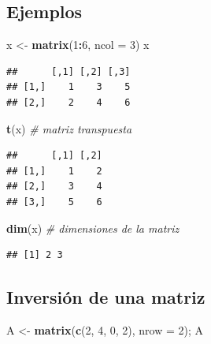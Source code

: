 \documentclass[]{book}
\newenvironment{Shaded}{\begin{snugshade}}{\end{snugshade}}
\newcommand{\KeywordTok}[1]{\textcolor[rgb]{0.13,0.29,0.53}{\textbf{#1}}}
\newcommand{\DataTypeTok}[1]{\textcolor[rgb]{0.13,0.29,0.53}{#1}}
\newcommand{\DecValTok}[1]{\textcolor[rgb]{0.00,0.00,0.81}{#1}}
\newcommand{\StringTok}[1]{\textcolor[rgb]{0.31,0.60,0.02}{#1}}
\newcommand{\CommentTok}[1]{\textcolor[rgb]{0.56,0.35,0.01}{\textit{#1}}}
\newcommand{\OperatorTok}[1]{\textcolor[rgb]{0.81,0.36,0.00}{\textbf{#1}}}
\newcommand{\NormalTok}[1]{#1}
\begin{document}
\subsection{Ejemplos}\label{ejemplos}

\begin{Shaded}
\begin{Highlighting}[]
\NormalTok{x <-}\StringTok{ }\KeywordTok{matrix}\NormalTok{(}\DecValTok{1}\OperatorTok{:}\DecValTok{6}\NormalTok{, }\DataTypeTok{ncol =} \DecValTok{3}\NormalTok{)}
\NormalTok{x}
\end{Highlighting}
\end{Shaded}

\begin{verbatim}
##      [,1] [,2] [,3]
## [1,]    1    3    5
## [2,]    2    4    6
\end{verbatim}

\begin{Shaded}
\begin{Highlighting}[]
\KeywordTok{t}\NormalTok{(x)  }\CommentTok{# matriz transpuesta}
\end{Highlighting}
\end{Shaded}

\begin{verbatim}
##      [,1] [,2]
## [1,]    1    2
## [2,]    3    4
## [3,]    5    6
\end{verbatim}

\begin{Shaded}
\begin{Highlighting}[]
\KeywordTok{dim}\NormalTok{(x)  }\CommentTok{# dimensiones de la matriz}
\end{Highlighting}
\end{Shaded}

\begin{verbatim}
## [1] 2 3
\end{verbatim}

\subsection{Inversión de una matriz}\label{inversion-de-una-matriz}

\begin{Shaded}
\begin{Highlighting}[]
\NormalTok{A <-}\StringTok{ }\KeywordTok{matrix}\NormalTok{(}\KeywordTok{c}\NormalTok{(}\DecValTok{2}\NormalTok{, }\DecValTok{4}\NormalTok{, }\DecValTok{0}\NormalTok{, }\DecValTok{2}\NormalTok{), }\DataTypeTok{nrow =} \DecValTok{2}\NormalTok{); A}
\end{Highlighting}
\end{Shaded}
\end{document}
